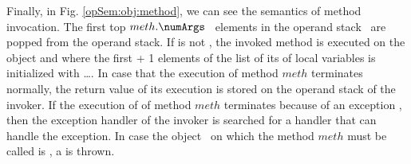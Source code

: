        Finally, in Fig. \ref{opSem:obj:method}, we can see the semantics of method invocation. 
	 The first top $meth.\numArgs$ \ elements in the operand stack \stackOnly \ are popped from the operand stack. If 
          is not \Mynull, the invoked method is executed on the object    
	 and where the first \numArgs + 1 elements of the list of its of local variables is initialized with 
          \ldots \stackOnlyParam{\counterOnly}. In case that the execution of method $meth$
	 terminates normally, the return value \Res{}  of its execution is stored on the operand stack of the invoker. 
	 If the execution of of method $meth$ terminates because of an exception \Exc, then the exception handler of the invoker is searched for
	 a handler that can handle the exception. In case the object   \  on which the  method $meth$ must be 
	 called is \Mynull, a \NullPointerExc{} is thrown.  			


